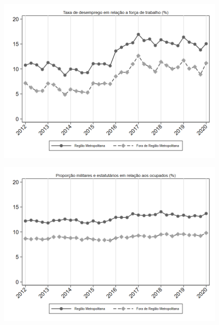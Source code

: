 \begin{frame}[label=_composicao_demografica_regiao_metro_taxa_de_desemprego]{}
\textit{\hyperlink{_composicao_demografica_regiao_metro}{}}
\begin{figure}
  \centering
  \includegraphics[width=1.0\linewidth]{../../analysis/output/composicao_demografica/area_geografica/_composicao_demografica_regiao_metro_taxa_de_desemprego.png}
  \caption{}
  \label{fig:_composicao_demografica_regiao_metro_taxa_de_desemprego}
\end{figure}
\end{frame}

\begin{frame}[label=_composicao_demografica_regiao_metro_prop_militar]{}
\textit{\hyperlink{_composicao_demografica_regiao_metro}{}}
\begin{figure}
  \centering
  \includegraphics[width=1.0\linewidth]{../../analysis/output/composicao_demografica/area_geografica/_composicao_demografica_regiao_metro_prop_militar.png}
  \caption{}
  \label{fig:_composicao_demografica_regiao_metro_prop_militar}
\end{figure}
\end{frame}


